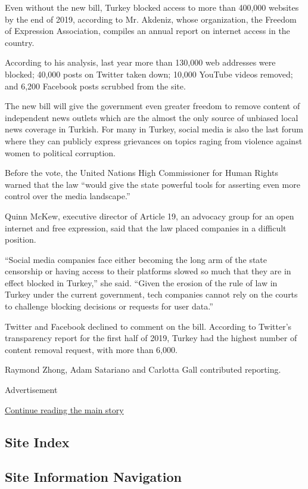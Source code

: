 Even without the new bill, Turkey blocked access to more than 400,000
websites by the end of 2019, according to Mr. Akdeniz, whose
organization, the Freedom of Expression Association, compiles an annual
report on internet access in the country.

According to his analysis, last year more than 130,000 web addresses
were blocked; 40,000 posts on Twitter taken down; 10,000 YouTube videos
removed; and 6,200 Facebook posts scrubbed from the site.

The new bill will give the government even greater freedom to remove
content of independent news outlets which are the almost the only source
of unbiased local news coverage in Turkish. For many in Turkey, social
media is also the last forum where they can publicly express grievances
on topics raging from violence against women to political corruption.

Before the vote, the United Nations High Commissioner for Human Rights
warned that the law ``would give the state powerful tools for asserting
even more control over the media landscape.''

Quinn McKew, executive director of Article 19, an advocacy group for an
open internet and free expression, said that the law placed companies in
a difficult position.

``Social media companies face either becoming the long arm of the state
censorship or having access to their platforms slowed so much that they
are in effect blocked in Turkey,'' she said. ``Given the erosion of the
rule of law in Turkey under the current government, tech companies
cannot rely on the courts to challenge blocking decisions or requests
for user data.''

Twitter and Facebook declined to comment on the bill. According to
Twitter's transparency report for the first half of 2019, Turkey had the
highest number of content removal request, with more than 6,000.

Raymond Zhong, Adam Satariano and Carlotta Gall contributed reporting.

Advertisement

\protect\hyperlink{after-bottom}{Continue reading the main story}

\hypertarget{site-index}{%
\subsection{Site Index}\label{site-index}}

\hypertarget{site-information-navigation}{%
\subsection{Site Information
Navigation}\label{site-information-navigation}}

